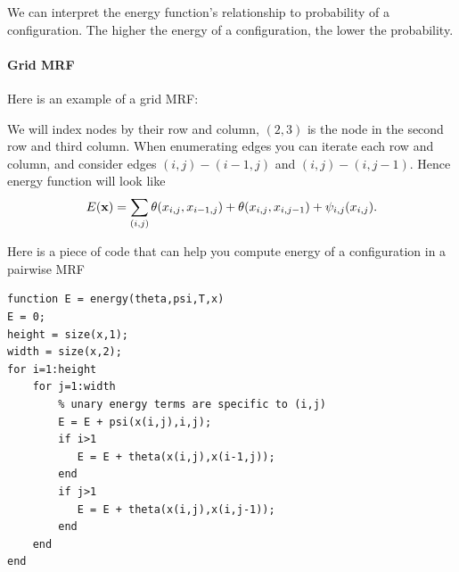 \documentclass{article}
\begin{document}
We can interpret the energy function's relationship to probability of a configuration. The higher the energy of a configuration, the lower the probability.

\paragraph{Grid MRF}
Here is an example of a grid MRF:
\begin{center}
\end{center}
We will index nodes by their row and column, $(2,3)$ is the node in the second row and third column.
When enumerating edges you can iterate each row and column, and consider edges $(i,j) - (i-1,j)$ and
$(i,j) - (i,j-1)$. Hence energy function will look like
\[
E(\mathbf{x}) = \sum_{(i,j)} \theta(x_{i,j},x_{i-1,j}) + \theta(x_{i,j},x_{i,j-1}) + \psi_{i,j}(x_{i,j}).
\]

Here is a piece of code that can help you compute energy of a configuration in a pairwise MRF
\begin{verbatim}
function E = energy(theta,psi,T,x)
E = 0;
height = size(x,1);
width = size(x,2);
for i=1:height
    for j=1:width
        % unary energy terms are specific to (i,j)
        E = E + psi(x(i,j),i,j);
        if i>1
           E = E + theta(x(i,j),x(i-1,j));
        end
        if j>1
           E = E + theta(x(i,j),x(i,j-1));
        end
    end
end
\end{verbatim}
\end{document}
